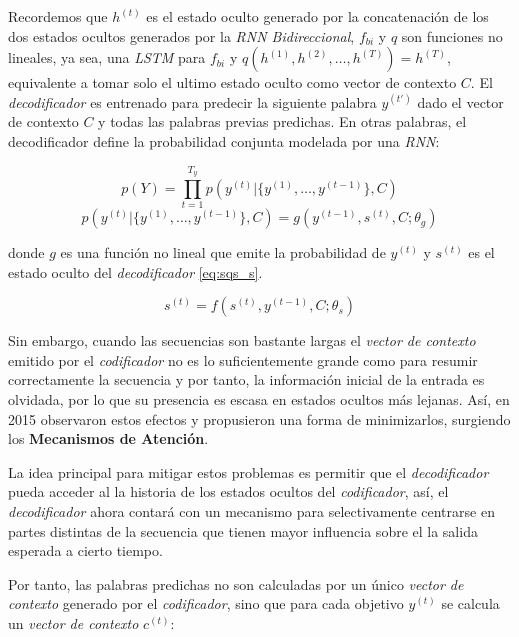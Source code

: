 Recordemos que $h^{(t)}$ es el estado oculto generado por la concatenación de los dos estados ocultos
generados por la \textit{RNN Bidireccional}, $f_{bi}$ y $q$ son funciones no lineales, ya sea,
una \textit{LSTM} para $f_{bi}$ y $q({h^{(1)}, h^{(2)}, \dots, h^{(T)}}) = h^{(T)}$, equivalente a
tomar solo el ultimo estado oculto como vector de contexto $C$. El \textit{decodificador} es entrenado
para predecir la siguiente palabra $y^{(t')}$ dado el vector de contexto $C$ y todas las palabras
previas predichas. En otras palabras, el decodificador define la probabilidad conjunta modelada por una
\textit{RNN}:

\begin{equation}
    p(Y) = \prod_{t=1}^{T_y} p(y^{(t)} | \{y^{(1)}, \dots , y^{(t-1)}\}, C)
\end{equation}
\begin{equation}
    p(y^{(t)} | \{y^{(1)}, \dots , y^{(t-1)}\}, C) = g(y^{(t-1)}, s^{(t)}, C; \theta_g)
\end{equation}

donde $g$ es una función no lineal que emite la probabilidad de $y^{(t)}$ y $s^{(t)}$ es el estado oculto
del \textit{decodificador} \ref{eq:sqs_s}.

\begin{equation}
    s^{(t)} = f(s^{(t)}, y^{(t-1)}, C; \theta_s)
    \label{eq:sqs_s}
\end{equation}


Sin embargo, cuando las secuencias son bastante largas el \textit{vector de contexto} emitido por el
\textit{codificador} no es lo suficientemente grande como para resumir correctamente la secuencia y
por tanto, la información inicial de la entrada es olvidada, por lo que su presencia es escasa en estados
ocultos más lejanas. Así, en 2015 \citeauthor{bahdanau2016neural} observaron estos efectos y
propusieron una forma de minimizarlos, surgiendo los \textbf{Mecanismos de Atención}.

La idea principal para mitigar estos problemas es permitir que el \textit{decodificador} pueda acceder al
la historia de los estados ocultos del \textit{codificador}, así, el \textit{decodificador} ahora contará con un mecanismo
para selectivamente centrarse en partes distintas de la secuencia que tienen mayor influencia sobre el
la salida esperada a cierto tiempo.

Por tanto, las palabras predichas no son calculadas por un único \textit{vector de contexto} generado por
el \textit{codificador}, sino que para cada objetivo $y^{(t)}$ se calcula un \textit{vector de contexto} $c^{(t)}$:

